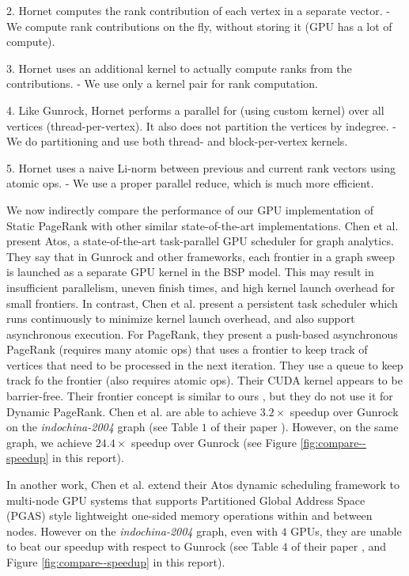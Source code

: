 2. Hornet computes the rank contribution of each vertex in a separate vector.
- We compute rank contributions on the fly, without storing it (GPU has a lot of compute).

3. Hornet uses an additional kernel to actually compute ranks from the contributions.
- We use only a kernel pair for rank computation.

4. Like Gunrock, Hornet performs a parallel for (using custom kernel) over all vertices (thread-per-vertex).
It also does not partition the vertices by indegree.
- We do partitioning and use both thread- and block-per-vertex kernels.

5. Hornet uses a naive Li-norm between previous and current rank vectors using atomic ops.
- We use a proper parallel reduce, which is much more efficient.


We now indirectly compare the performance of our GPU implementation of Static PageRank with other similar state-of-the-art implementations. Chen et al. \cite{chen2022atos} present Atos, a state-of-the-art task-parallel GPU scheduler for graph analytics. They say that in Gunrock and other frameworks, each frontier in a graph sweep is launched as a separate GPU kernel in the BSP model. This may result in insufficient parallelism, uneven finish times, and high kernel launch overhead for small frontiers. In contrast, Chen et al. present a persistent task scheduler which runs continuously to minimize kernel launch overhead, and also support asynchronous execution. For PageRank, they present a push-based asynchronous PageRank (requires many atomic ops) that uses a frontier to keep track of vertices that need to be processed in the next iteration. They use a queue to keep track fo the frontier (also requires atomic ops). Their CUDA kernel appears to be barrier-free. Their frontier concept is similar to ours \cite{sahu2024df}, but they do not use it for Dynamic PageRank. Chen et al. are able to achieve $3.2\times$ speedup over Gunrock on the \textit{indochina-2004} graph (see Table $1$ of their paper \cite{chen2022atos}). However, on the same graph, we achieve $24.4\times$ speedup over Gunrock (see Figure \ref{fig:compare--speedup} in this report).

In another work, Chen et al. \cite{chen2022scalable} extend their Atos dynamic scheduling framework to multi-node GPU systems that supports Partitioned Global Address Space (PGAS) style lightweight one-sided memory operations within and between nodes. However on the \textit{indochina-2004} graph, even with $4$ GPUs, they are unable to beat our speedup with respect to Gunrock (see Table $4$ of their paper \cite{chen2022scalable}, and Figure \ref{fig:compare--speedup} in this report).

